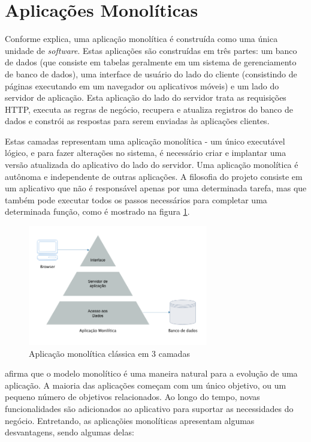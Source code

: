 \section{Aplicações Monolíticas}\label{sec:monolitico}

Conforme  explica, uma aplicação monolítica é construída como uma única unidade de \textit{software}. Estas aplicações são construídas em três partes: um banco de dados (que consiste em tabelas geralmente em um sistema de gerenciamento de banco de dados), uma interface de usuário do lado do cliente (consistindo de páginas executando em um navegador ou aplicativos móveis) e um lado do servidor de aplicação. Esta aplicação do lado do servidor trata as requisições HTTP, executa as regras de negócio, recupera e atualiza registros do banco de dados e constrói as respostas para serem enviadas às aplicações clientes. 

Estas camadas representam uma aplicação monolítica - um único executável lógico, e para fazer alterações no sistema, é necessário criar e implantar uma versão atualizada do aplicativo do lado do servidor. Uma aplicação monolítica é autônoma e independente de outras aplicações. A filosofia do projeto consiste em um aplicativo que não é responsável apenas por uma determinada tarefa, mas que também pode executar todos os passos necessários para completar uma determinada função, como é mostrado na figura \ref{fig:three-tier}.

\begin{figure}[htbp]
    \centering
    \includegraphics[width=0.7\textwidth]{figuras/monolithic-3-tier.png}
    \caption{Aplicação monolítica clássica em 3 camadas}
    \label{fig:three-tier}
\end{figure}

 afirma que o modelo monolítico é uma maneira natural para a evolução de uma aplicação. A maioria das aplicações começam com um único objetivo, ou um pequeno número de objetivos relacionados. Ao longo do tempo, novas funcionalidades são adicionados ao aplicativo para suportar as necessidades do negócio. Entretando, as aplicaçõies monolíticas apresentam algumas desvantagens, sendo algumas delas: 

